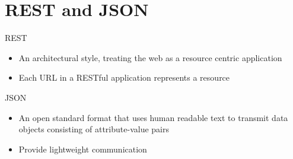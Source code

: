 \documentclass{article}[18pt]
\begin{document}
\section{REST and JSON}
REST
\begin{itemize}
	\item An architectural style, treating the web as a resource centric application 
	\item Each URL in a RESTful application represents a resource
\end{itemize}
JSON
\begin{itemize}
	\item An open standard format that uses human readable text to transmit data objects consisting of attribute-value pairs
	\item Provide lightweight communication
\end{itemize}
\end{document}
